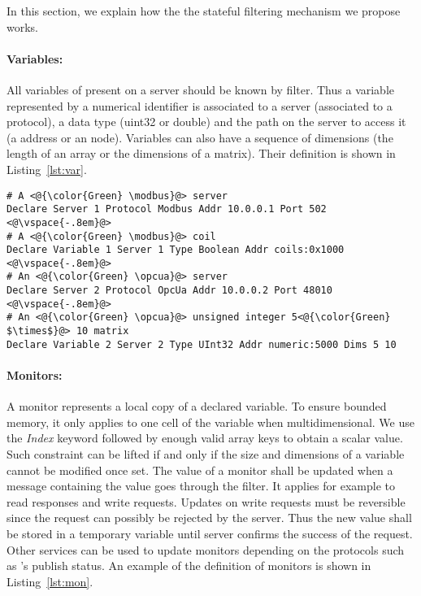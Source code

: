In this section, we explain how the the stateful filtering mechanism we propose
works.

\paragraph{Variables:} All variables of present on a server should be known by
filter. Thus a variable represented by a numerical identifier is associated to a server
(associated to a protocol), a data type (\eg uint32 or double) and the path on 
the server to access it (\eg a \modbus address or an \opcua node).
Variables can also have a sequence of dimensions (\eg the length of an array or
the dimensions of a matrix).
Their definition is shown in Listing~\ref{lst:var}.

\begin{lstlisting}[label=lst:var,caption=Variable definition example]
# A <@{\color{Green} \modbus}@> server
Declare Server 1 Protocol Modbus Addr 10.0.0.1 Port 502
<@\vspace{-.8em}@>
# A <@{\color{Green} \modbus}@> coil
Declare Variable 1 Server 1 Type Boolean Addr coils:0x1000
<@\vspace{-.8em}@>
# An <@{\color{Green} \opcua}@> server
Declare Server 2 Protocol OpcUa Addr 10.0.0.2 Port 48010
<@\vspace{-.8em}@>
# An <@{\color{Green} \opcua}@> unsigned integer 5<@{\color{Green} $\times$}@> 10 matrix
Declare Variable 2 Server 2 Type UInt32 Addr numeric:5000 Dims 5 10
\end{lstlisting}

\paragraph{Monitors:} A monitor represents a local copy of a declared variable.
To ensure bounded memory, it only applies to one cell of the variable when
multidimensional.
We use the {\em Index} keyword followed by enough valid array keys to obtain a
scalar value.
Such constraint can be lifted if and only if the size and dimensions of a
variable cannot be modified once set.
The value of a monitor shall be updated when a message containing the value
goes through the filter.
It applies for example to read responses and write requests.
Updates on write requests must be reversible since the request can possibly be
rejected by the server.
Thus the new value shall be stored in a temporary variable until server confirms
the success of the request.
Other services can be used to update monitors depending on the protocols such
as \opcua's publish status.
An example of the definition of monitors is shown in Listing~\ref{lst:mon}.

